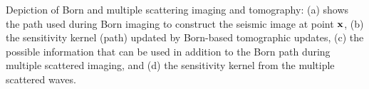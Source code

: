 
%
{Depiction of Born and multiple scattering imaging and tomography: (a) shows the path used during Born imaging to construct
the seismic image at point ${\bf x}$, (b) the sensitivity kernel (path) updated by Born-based tomographic updates,
(c) the possible information that can be used in addition to the Born path during  multiple scattered imaging, and (d) 
the sensitivity kernel from the multiple scattered waves.}


%
%
%
%


